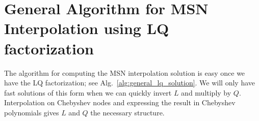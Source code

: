 \section{General Algorithm for MSN Interpolation using LQ factorization}
\label{sec:interp_LQ_fast}

The algorithm for computing the MSN interpolation solution is easy
once we have the LQ factorization;
see Alg.~\ref{alg:general_lq_solution}.
We will only have fast solutions of this form when we can quickly invert
$L$ and multiply by $Q$.
Interpolation on Chebyshev nodes and expressing the result in
Chebyshev polynomials gives $L$ and $Q$ the necessary structure.





